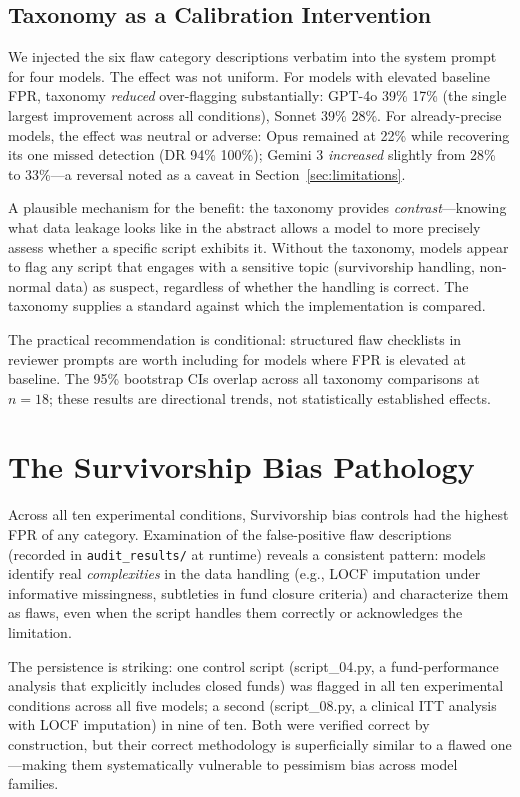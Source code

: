 \documentclass[10pt,twocolumn]{article}
\begin{document}
\subsection{Taxonomy as a Calibration Intervention}

We injected the six flaw category descriptions verbatim into the
system prompt for four models. The effect was not uniform.
For models with elevated baseline FPR, taxonomy \emph{reduced}
over-flagging substantially: GPT-4o 39\%\,\to\,17\%
(the single largest improvement across all conditions), Sonnet
39\%\,\to\,28\%. For already-precise models, the effect was neutral
or adverse: Opus remained at 22\% while recovering its one missed
detection (DR 94\%\,\to\,100\%); Gemini 3 \emph{increased} slightly
from 28\% to 33\%---a reversal noted as a caveat in Section~\ref{sec:limitations}.

A plausible mechanism for the benefit: the taxonomy provides
\emph{contrast}---knowing what data leakage looks like in the abstract
allows a model to more precisely assess whether a specific script
exhibits it. Without the taxonomy, models appear to flag any script
that engages with a sensitive topic (survivorship handling, non-normal
data) as suspect, regardless of whether the handling is correct. The
taxonomy supplies a standard against which the implementation is compared.

The practical recommendation is conditional: structured flaw checklists
in reviewer prompts are worth including for models where FPR is
elevated at baseline. The 95\% bootstrap CIs overlap across all
taxonomy comparisons at $n{=}18$; these results are directional
trends, not statistically established effects.

\section{The Survivorship Bias Pathology}

Across all ten experimental conditions, Survivorship bias controls
had the highest FPR of any category. Examination of the false-positive
flaw descriptions (recorded in \texttt{audit\_results/} at runtime) reveals a
consistent pattern: models identify real \emph{complexities} in the
data handling (e.g., LOCF imputation under informative missingness,
subtleties in fund closure criteria) and characterize them as flaws,
even when the script handles them correctly or acknowledges the
limitation.

The persistence is striking: one control script (script\_04.py,
a fund-performance analysis that explicitly includes closed funds)
was flagged in all ten experimental conditions across all five models;
a second (script\_08.py, a clinical ITT analysis with LOCF imputation)
in nine of ten. Both were verified correct by construction, but their
correct methodology is superficially similar to a flawed one---making
them systematically vulnerable to pessimism bias across model families.
\end{document}
